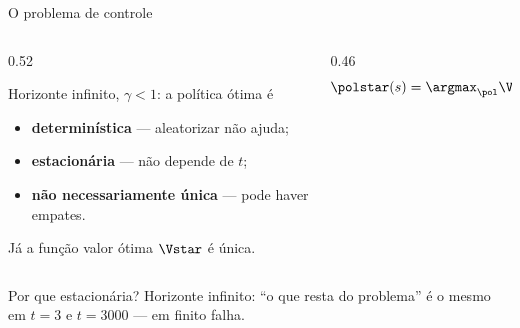 \documentclass[aspectratio=169, 11pt]{beamer}
\begin{document}
\begin{frame}{O problema de controle}
  \begin{columns}[T]
    \begin{column}{0.52\textwidth}
      {\small Horizonte infinito, $\gamma<1$: a política ótima é
      \begin{itemize}\setlength{\itemsep}{0.2ex}
        \item \textbf{determinística} --- aleatorizar não ajuda;
        \item \textbf{estacionária} --- não depende de $t$;
        \item \textbf{não necessariamente única} --- pode haver empates.
      \end{itemize}
      \smallskip
      Já a \alert{função valor ótima} $\Vstar$ é única.}
    \end{column}
    \begin{column}{0.46\textwidth}
  \vspace{+1.9em}
  \[
    \polstar(s) = \argmax_{\pol} \Vpi(s)
  \]
  \vspace{-1.2em}
    \end{column}
  \end{columns}
  \vspace{-0.2em}
  \begin{ideiabox}
    Por que estacionária? Horizonte infinito: ``o que resta do problema'' é o mesmo em
    $t=3$ e $t=3000$ --- em finito falha.
  \end{ideiabox}
\end{frame}
\end{document}
